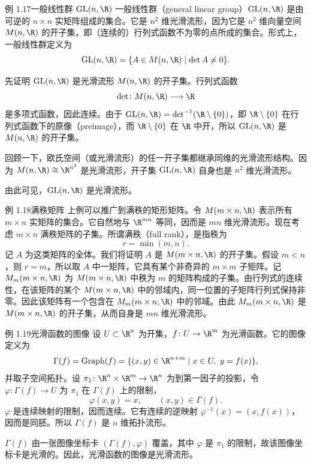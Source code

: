 \begin{statement}{例 1.17}{一般线性群 $\mathrm{GL}(n,\R)$}
一般线性群（general linear group）$\mathrm{GL}(n,\R)$ 是由可逆的 $n\times n$ 实矩阵组成的集合。它是 $n^2$ 维光滑流形，因为它是 $n^2$ 维向量空间 $M(n,\R)$ 的开子集，即（连续的）行列式函数不为零的点所成的集合。形式上，一般线性群定义为
\[
  \mathrm{GL}(n,\R)=\{A\in M(n,\R)\mid\det A\ne0\}.
\]

先证明 $\mathrm{GL}(n,\R)$ 是光滑流形 $M(n,\R)$ 的开子集。行列式函数
\[
  \det\colon M(n,\R)\longrightarrow\R
\]
是多项式函数，因此连续。由于 $\mathrm{GL}(n,\R)=\det^{-1}(\R\setminus\{0\})$，即 $\R\setminus\{0\}$ 在行列式函数下的原像（preimage），而 $\R\setminus\{0\}$ 在 $\R$ 中开，所以 $\mathrm{GL}(n,\R)$ 是 $M(n,\R)$ 的开子集。

回顾一下，欧氏空间（或光滑流形）的任一开子集都继承同维的光滑流形结构。因为 $M(n,\R)\cong\R^{n^2}$ 是光滑流形，开子集 $\mathrm{GL}(n,\R)$ 自身也是 $n^2$ 维光滑流形。

由此可见，$\mathrm{GL}(n,\R)$ 是光滑流形。
\end{statement}

\begin{statement}{例 1.18}{满秩矩阵}
上例可以推广到满秩的矩形矩阵。令 $M(m\times n,\R)$ 表示所有 $m\times n$ 实矩阵的集合。它自然地与 $\R^{mn}$ 等同，因而是 $mn$ 维光滑流形。现在考虑 $m\times n$ 满秩矩阵的子集。所谓满秩（full rank），是指秩为
\[
  r=\min(m,n).
\]
记 $A$ 为这类矩阵的全体。我们将证明 $A$ 是 $M(m\times n,\R)$ 的开子集。假设 $m<n$，则 $r=m$，所以取 $A$ 中一矩阵，它具有某个非奇异的 $m\times m$ 子矩阵。记 $M_m(m\times n,\R)$ 为 $M(m\times n,\R)$ 中秩为 $m$ 的矩阵构成的子集。由行列式的连续性，在该矩阵的某个 $M(m\times n,\R)$ 中的邻域内，同一位置的子矩阵行列式保持非零。因此该矩阵有一个包含在 $M_m(m\times n,\R)$ 中的邻域。由此 $M_m(m\times n,\R)$ 是 $M(m\times n,\R)$ 的开子集，从而自身是 $mn$ 维光滑流形。
\end{statement}

\begin{statement}{例 1.19}{光滑函数的图像}
设 $U\subset\R^n$ 为开集，$f\colon U\to\R^m$ 为光滑函数。它的图像定义为
\[
  \Gamma(f)=\operatorname{Graph}(f)
    =\{(x,y)\in\R^{n+m}\mid x\in U,\ y=f(x)\},
\]
并取子空间拓扑。设 $\pi_1\colon\R^n\times\R^m\to\R^n$ 为到第一因子的投影，令 $\varphi\colon\Gamma(f)\to U$ 为 $\pi_1$ 在 $\Gamma(f)$ 上的限制，
\[
  \varphi(x,y)=x,\qquad (x,y)\in\Gamma(f).
\]
$\varphi$ 是连续映射的限制，因而连续。它有连续的逆映射 $\varphi^{-1}(x)=(x,f(x))$，因而是同胚。所以 $\Gamma(f)$ 是 $n$ 维拓扑流形。

$\Gamma(f)$ 由一张图像坐标卡 $(\Gamma(f),\varphi)$ 覆盖，其中 $\varphi$ 是 $\pi_1$ 的限制，故该图像坐标卡是光滑的。因此，光滑函数的图像是光滑流形。
\end{statement}
